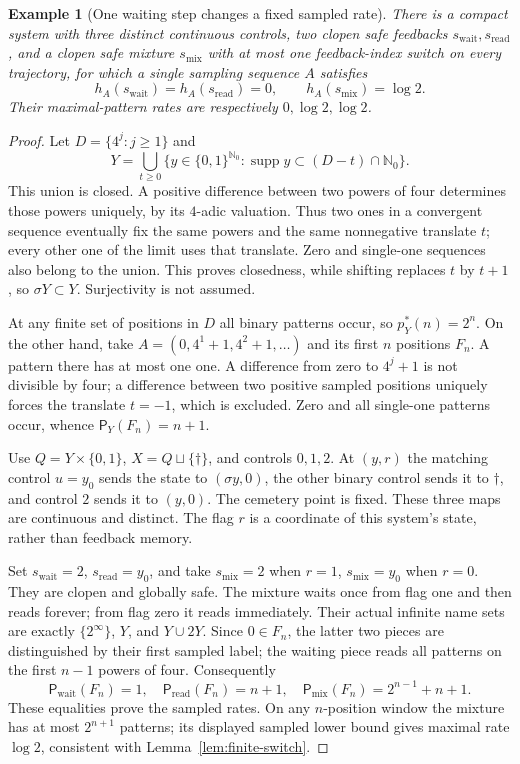 \documentclass[11pt,reqno]{amsart}
\numberwithin{equation}{section}
\newtheorem{example}[theorem]{Example}
\theoremstyle{definition}
\newcommand{\Nzero}{\mathbb N_0}
\newcommand{\Patt}{\mathsf P}
\newcommand{\supp}{\operatorname{supp}}
\begin{document}
\begin{example}[One waiting step changes a fixed sampled rate]
\label{ex:one-wait}
There is a compact system with three distinct continuous controls,
two clopen safe feedbacks $s_{\mathrm{wait}},s_{\mathrm{read}}$, and a
clopen safe mixture $s_{\mathrm{mix}}$ with at most one feedback-index
switch on every trajectory, for which a single sampling sequence
$A$ satisfies
\[
 h_A(s_{\mathrm{wait}})=h_A(s_{\mathrm{read}})=0,
 \qquad h_A(s_{\mathrm{mix}})=\log2.
\]
Their maximal-pattern rates are respectively $0,\log2,\log2$.
\end{example}
\begin{proof}
Let $D=\{4^j:j\ge1\}$ and
\[
 Y=\bigcup_{t\ge0}
 \{y\in\{0,1\}^{\Nzero}:\supp y\subset(D-t)\cap\Nzero\}.
\]
This union is closed. A positive difference between two powers
of four determines those powers uniquely, by its $4$-adic
valuation. Thus two ones in a convergent sequence eventually
fix the same powers and the same nonnegative translate $t$;
every other one of the limit uses that translate. Zero and
single-one sequences also belong to the union. This proves
closedness, while shifting replaces $t$ by $t+1$, so
$\sigma Y\subset Y$. Surjectivity is not assumed.

At any finite set of positions in $D$ all binary patterns occur,
so $p_Y^*(n)=2^n$. On the other hand, take
$A=(0,4^1+1,4^2+1,\ldots)$ and its first $n$ positions $F_n$.
A pattern there has at most one one. A difference from zero
to $4^j+1$ is not divisible by four; a difference between two
positive sampled positions uniquely forces the translate
$t=-1$, which is excluded. Zero and all single-one patterns
occur, whence $\Patt_Y(F_n)=n+1$.

Use $Q=Y\times\{0,1\}$, $X=Q\sqcup\{\dagger\}$, and
controls $0,1,2$. At $(y,r)$ the matching control $u=y_0$
sends the state to $(\sigma y,0)$, the other binary control
sends it to $\dagger$, and control $2$ sends it to $(y,0)$.
The cemetery point is fixed. These three maps are continuous
and distinct. The flag $r$ is a coordinate of this system's
state, rather than feedback memory.

Set $s_{\mathrm{wait}}=2$, $s_{\mathrm{read}}=y_0$, and take
$s_{\mathrm{mix}}=2$ when $r=1$, $s_{\mathrm{mix}}=y_0$ when $r=0$.
They are clopen and globally safe. The mixture waits once
from flag one and then reads forever; from flag zero it reads
immediately. Their actual infinite name sets are exactly
$\{2^\infty\}$, $Y$, and $Y\cup2Y$. Since $0\in F_n$,
the latter two pieces are distinguished by their first sampled
label; the waiting piece reads all patterns on the first
$n-1$ powers of four. Consequently
\[
 \Patt_{\mathrm{wait}}(F_n)=1,\quad
 \Patt_{\mathrm{read}}(F_n)=n+1,\quad
 \Patt_{\mathrm{mix}}(F_n)=2^{n-1}+n+1.
\]
These equalities prove the sampled rates. On any $n$-position
window the mixture has at most $2^{n+1}$ patterns; its displayed
sampled lower bound gives maximal rate $\log2$, consistent
with Lemma~\ref{lem:finite-switch}.
\end{proof}
\end{document}
